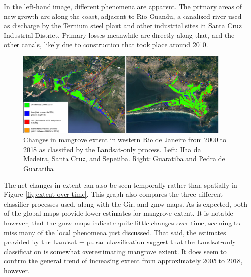 In the left-hand image, different phenomena are apparent. The primary areas of new growth are along the coast, adjacent to Rio Guandu, a canalized river used as discharge by the Ternium steel plant and other industrial sites in Santa Cruz Industrial District. Primary losses meanwhile are directly along that, and the other canals, likely due to construction that took place around 2010. 
	
\begin{figure}[H] 
\centering
\includegraphics[width=0.95\textwidth]{Figures/chap4/extent_changes.png}
\caption[Changes in Mangrove Extent 2000-2018]{Changes in mangrove extent in western Rio de Janeiro from 2000 to 2018 as classified by the Landsat-only process. Left: Ilha da Madeira, Santa Cruz, and Sepetiba. Right: Guaratiba and Pedra de Guaratiba}
\label{fig:extent-changes}
\end{figure}

The net changes in extent can also be seen temporally rather than spatially in Figure \ref{fig:extent-over-time}. This graph also compares the three different classifier processes used, along with the Giri and \ac{gmw} maps. As is expected, both of the global maps provide lower estimates for mangrove extent. It is notable, however, that the \ac{gmw} maps indicate quite little changes over time, seeming to miss many of the local phenomena just discussed. That said, the estimates provided by the Landsat + \ac{palsar} classification suggest that the Landsat-only classification is somewhat overestimating mangrove extent. It does seem to confirm the general trend of  increasing extent from approximately 2005 to 2018, however.  

